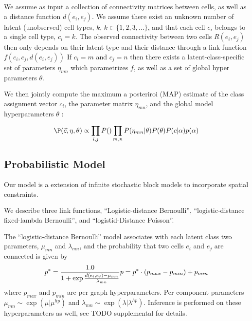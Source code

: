 \documentclass{article}
\begin{document}




We assume as input a collection of connectivity matrices between
cells, as well as a distance function $d(e_i, e_j)$. We assume there
exist an unknown number of latent (unobserved) cell types, $k$, $k \in
\{1, 2, 3, \dots\}$, and that each cell $e_i$ belongs to a single cell
type, $c_i = k$. The observed connectivity between two cells $R(e_i,
e_j)$ then only depends on their latent type and their distance
through a link function $f(c_i, c_j, d(e_i, e_j))$ If $c_i=m$ and
$c_j=n$ then there exists a latent-class-specific set of parameters
$\eta_{mn}$ which parametrizes $f$, as well as a set of global hyper parameters $\theta$. 

We then jointly compute the maximum a posteriroi (MAP) estimate of the
class assignment vector ${c_i}$, the parameter matrix $\eta_{mn}$, and
the global model hyperparameters $\theta$ :

\begin{equation}
  \P(\vec{c}, \eta, \theta) \propto \prod_{i, j} P() \prod_{m, n} P(\eta_{mn} | \theta)  P(\theta) P(c | \alpha) p(\alpha) 
\end{equation}



\subsection{Probabilistic Model}

Our model is a extension of infinite stochastic block models
\cite{Kemp, other guys} to incorporate spatial constraints.

We describe three link functions, ``Logistic-distance Bernoulli'',
``logistic-distance fixed-lambda Bernoulli'', and ``logistid-Distance
Poisson''. 

The ``logistic-distance Bernoulli'' model associates with each latent class 
two parameters, $\mu_{mn}$ and $\lambda_{mn}$, and the probability that two
cells $e_i$ and $e_j$ are connected is given by
\begin{equation}
p^* = \frac{1.0}{1 + \exp \frac{d(e_i, e_j) - \mu_{mn}}{\lambda_{mn}}}\\
p = p^* \cdot (p_{max} - p_{min}) + p_{min}
\end{equation}
where $p_{max}$ and $p_{min}$ are per-graph hyperparameters. Per-component parameters $\mu_{mn} \sim \exp(\mu | \mu^{hp})$ and $\lambda_{mn} \sim \exp(\lambda | \lambda^{hp})$. 
Inference is performed on these hyperparameters as well, see TODO supplemental 
for details. 
\end{document}

